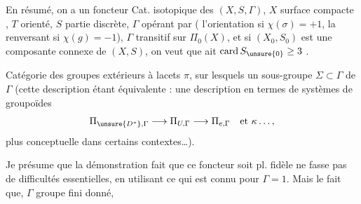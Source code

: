 En résumé, on a un foncteur 
Cat. isotopique des \((X,S,\Gamma)\), \(X\) surface compacte ,
\(T\) orienté, \(S\) partie discrète, \(\Gamma\) opérant par 
(\inserted{\(\sigma\in\Gamma\)} l'orientation si \(\chi(\sigma)=+1\), la renversant
si \(\chi(g)=-1\)), \(\Gamma\) transitif sur \(\Pi_0(X)\),
 et si \((X_0,S_0)\) est une composante connexe
de \((X,S)\), on veut que 
ait \(\operatorname{card} S_{\unsure{0}}\geq 3\) .

\diagram{\begin{tikzcd}[row sep=2.5em]
{} \arrow[d] \\
{}
\end{tikzcd}}

Catégorie des groupes extérieurs à lacets \(\pi\),
sur lesquels un sous-groupe \(\Sigma\subset\Gamma\) de \(\Gamma\) 
(cette description étant
équivalente : une description en termes
de systèmes de groupoïdes
\[
\Pi_{\unsure{D^*},\Gamma}\longrightarrow\Pi_{U,\Gamma}
\longrightarrow\Pi_{e,\Gamma}\quad\text{et }\kappa\ldots,
\]
plus conceptuelle dans certains contextes\ldots).

 Je présume que la démonstration
 fait que ce foncteur soit pl. fidèle
ne fasse pas de difficultés essentielles,
en utilisant ce qui est connu pour
\(\Gamma=1\). Mais le fait que,  \(\Gamma\) groupe
fini donné, 

